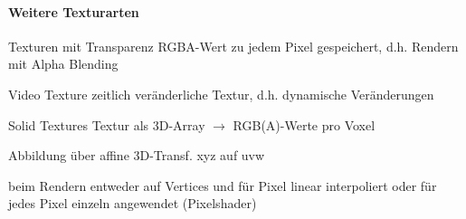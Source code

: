 \documentclass[landscape]{article}
\begin{document}
\begin{multicols}{3}
  \paragraph{Weitere Texturarten}
  \begin{description*}
    \item[Texturen mit Transparenz] RGBA-Wert zu jedem Pixel gespeichert, d.h. Rendern mit Alpha Blending
    \item[Video Texture] zeitlich veränderliche Textur, d.h. dynamische Veränderungen
    \item[Solid Textures] Textur als 3D-Array $\rightarrow$ RGB(A)-Werte pro Voxel
    \begin{itemize*} 
      \item Abbildung über affine 3D-Transf. xyz auf uvw
      \item beim Rendern entweder auf Vertices und für Pixel linear interpoliert oder für jedes Pixel einzeln angewendet (Pixelshader)
    \end{itemize*}
  \end{description*}
  

\end{multicols}
\end{document}
